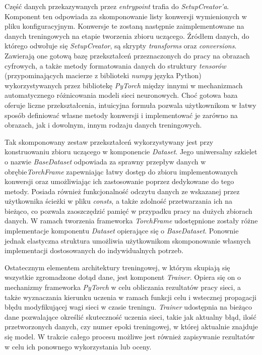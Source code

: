     Część danych przekazywanych przez \textit{entrypoint} trafia do \textit{SetupCreator'a}. Komponent
    ten odpowiada za skomponowanie listy konwersji wymienionych w pliku
    konfiguracyjnym. Konwersje te zostaną następnie zaimplementowane na danych treningowych
    na etapie tworzenia zbioru uczącego. Źródłem danych, do którego odwołuje się
    \textit{SetupCreator}, są skrypty \textit{transforms} oraz \textit{conversions}. Zawierają one gotową bazę
    przekształceń przeznaczonych do pracy na obrazach cyfrowych, a także metody
    formatowania danych do struktury \textit{tensorów} (przypominających macierze z biblioteki \textit{numpy}
    języka Python) wykorzystywanych przez bibliotekę \textit{PyTorch} między innymi w mechanizmach
    automatycznego różnicowania modeli sieci neuronowych. Choć gotowa baza oferuje
    liczne przekształcenia, intuicyjna formuła pozwala użytkownikom w łatwy sposób definiować
    własne metody konwersji i implementować je zarówno na obrazach, jak i dowolnym, innym
    rodzaju danych treningowych.

    Tak skomponowany zestaw przekształceń wykorzystywany jest przy konstruowaniu zbioru
    uczącego w komponencie \textit{Dataset}. Jego uniwersalny szkielet o nazwie \textit{BaseDataset}
    odpowiada za sprawny przepływ danych w obrębie\textit{TorchFrame} zapewniając łatwy dostęp
    do zbioru implementowanych konwersji oraz umożliwiając ich zastosowanie poprzez dedykowane
    do tego metody. Posiada również funkcjonalność odczytu danych ze wskazanej przez
    użytkownika ścieżki w pliku \textit{consts}, a także zdolność przetwarzania ich na bieżąco, co pozwala
    zaoszczędzić pamięć w przypadku pracy na dużych zbiorach danych. W ramach tworzenia
    frameworka \textit{TorchFrame} udostępnione zostały różne implementacje komponentu \textit{Dataset} opierające się o
    \textit{BaseDataset}. Ponownie jednak elastyczna struktura umożliwia użytkownikom
    skomponowanie własnych implementacji dostosowanych do indywidualnych potrzeb.

    Ostatecznym elementem architektury treningowej, w którym skupiają się wszystkie
    zgromadzone dotąd dane, jest komponent \textit{Trainer}. Opiera się on o mechanizmy
    frameworka \textit{PyTorch} w celu obliczania rezultatów pracy sieci, a także wyznaczania
    kierunku uczenia w ramach funkcji celu i wstecznej propagacji błędu modyfikującej wagi
    sieci w czasie treningu. \textit{Trainer} udostępnia na bieżąco dane pozwalające
    określić skuteczność uczenia sieci, takie jak aktualny błąd, ilość
    przetworzonych danych, czy numer epoki treningowej, w której aktualnie znajduje
    się model. W trakcie całego procesu możliwe jest również zapisywanie rezultatów
    w celu ich ponownego wykorzystania lub oceny.

